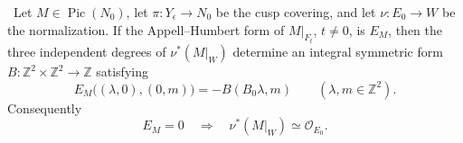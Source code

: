 \begin{lemma}
\label{wbII:lem:analytic-support-specialization}
\ Let \(M\in\operatorname{Pic}(N_0)\), let
\(\pi:Y_\epsilon\to N_0\) be the cusp covering, and let
\(\nu:E_0\to W\) be the normalization.  If the Appell--Humbert form of
\(M|_{F_t}\), \(t\ne0\), is \(E_M\), then the three independent degrees
of \(\nu^*(M|_W)\) determine an integral symmetric form
\(B:\mathbb Z^2\times\mathbb Z^2\to\mathbb Z\) satisfying
\[
 E_M\bigl((\lambda,0),(0,m)\bigr)
 =-B(B_0\lambda,m)
 \qquad(\lambda,m\in\mathbb Z^2).
\tag{W.121}\label{wbII:eq:W:5.17-A21}
\]
Consequently
\[
 E_M=0
 \quad\Longrightarrow\quad
 \nu^*(M|_W)\simeq\mathcal O_{E_0}.
\tag{W.122}\label{wbII:eq:W:5.17-A22}
\]
\end{lemma}

